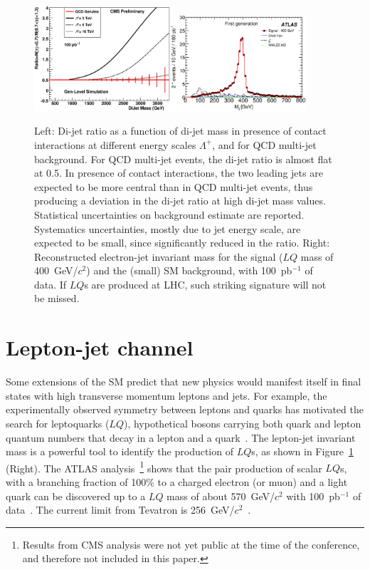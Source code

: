 \documentclass{cimento}
\begin{document}
\begin{figure}[htbp] 
\centering
\includegraphics[width=0.45\textwidth]{DiJetRatio100pbOptFix.eps}\includegraphics[width=0.45\textwidth]{Mejfig5R.eps}  
\caption{Left: Di-jet ratio as a function of di-jet mass in presence of 
contact interactions at different energy scales $\Lambda^{+}$, 
and for QCD multi-jet background. 
For QCD multi-jet events, the di-jet ratio is almost flat at 0.5. 
In presence of contact interactions, the two 
leading jets are expected to be more central than in QCD multi-jet events, 
thus producing a deviation in the di-jet ratio at high di-jet mass values.
Statistical uncertainties on background estimate are reported.  
Systematics uncertainties, mostly due to jet energy scale, are expected to be small, 
since significantly reduced in the ratio.
Right: Reconstructed electron-jet invariant mass for the signal 
($LQ$ mass of 400~GeV/$c^2$) and the (small) SM background, 
with 100~pb$^{-1}$ of data. If $LQ$s are produced at LHC, 
such striking signature will not be missed.}
\label{fig:DiJetRatioAndLQMej}
\end{figure}

\section{Lepton-jet channel} \label{leptonjet}
Some extensions of the SM predict that new physics would manifest itself in 
final states with high transverse momentum leptons and jets.
For example, the experimentally observed symmetry between 
leptons and quarks has motivated the search for leptoquarks ($LQ$), 
hypothetical bosons carrying both quark and lepton quantum numbers 
that decay in a lepton and a quark~\cite{Acosta:1999ws}.
The lepton-jet invariant mass is a powerful tool to identify the production 
of $LQ$s, as shown in Figure~\ref{fig:DiJetRatioAndLQMej} (Right). 
The ATLAS analysis~\footnote{Results from CMS analysis were not yet public at the time 
of the conference, and therefore not included in this paper.} 
shows that the pair production of scalar $LQ$s, with a branching fraction of 100\% 
to a charged electron (or muon) and a light quark can be discovered up to a $LQ$ 
mass of about 570~GeV/$c^2$ with 100~pb$^{-1}$ of data~\cite{LQATLAS}. 
The current limit from Tevatron is 256~GeV/$c^2$~\cite{Abazov:2004mk}.
\end{document}
